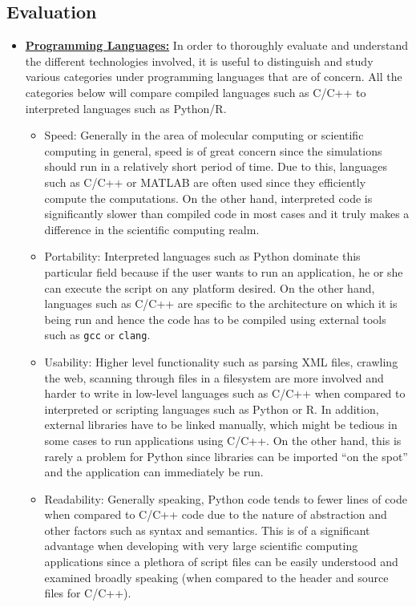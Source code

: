 \subsection*{Evaluation}

\begin{itemize}
    \item \textbf{\underline{Programming Languages:}} In order to thoroughly evaluate and understand the different technologies involved, it is useful to distinguish and study various categories under programming languages that are of concern. All the categories below will compare compiled languages such as C/C++ to interpreted languages such as Python/R. 
    
    \begin{itemize}
        \item Speed: Generally in the area of molecular computing or scientific computing in general, speed is of great concern since the simulations should run in a relatively short period of time. Due to this, languages such as C/C++ or MATLAB are often used since they efficiently compute the computations. On the other hand, interpreted code is significantly slower than compiled code in most cases and it truly makes a difference in the scientific computing realm.
        
        \item Portability: Interpreted languages such as Python dominate this particular field because if the user wants to run an application, he or she can execute the script on any platform desired. On the other hand, languages such as C/C++ are specific to the architecture on which it is being run and hence the code has to be compiled using external tools such as \verb|gcc| or \verb|clang|. 
        
        \item Usability: Higher level functionality such as parsing XML files, crawling the web, scanning through files in a filesystem are more involved and harder to write in low-level languages such as C/C++ when compared to interpreted or scripting languages such as Python or R.  In addition, external libraries have to be linked manually, which might be tedious in some cases to run applications using C/C++. On the other hand, this is rarely a problem for Python since libraries can be imported ``on the spot'' and the application can immediately be run.
        
        \item Readability: Generally speaking, Python code tends to fewer lines of code when compared to C/C++ code due to the nature of abstraction and other factors such as syntax and semantics. This is of a significant advantage when developing with very large scientific computing applications since a plethora of script files can be easily understood and examined broadly speaking (when compared to the header and source files for C/C++). 
        

\end{itemize}
\end{itemize}
